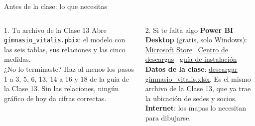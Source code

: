 \documentclass[aspectratio=169,11pt]{beamer}
\newcommand{\urlinstalar}{https://learn.microsoft.com/es-es/power-bi/fundamentals/desktop-get-the-desktop}
\newcommand{\urlstore}{https://apps.microsoft.com/detail/9ntxr16hnw1t?hl=es-co}
\newcommand{\urlcentro}{https://www.microsoft.com/download/details.aspx?id=58494}
\newcommand{\urldatos}{https://github.com/craljimenez/An-lisis_y_Visualizacion_de_Datos_para_la_Toma_de_Decisiones/raw/main/clases/semana07-clase14-dashboard-identificacion-insights/datos/gimnasio_vitalis.xlsx}
\begin{document}
\begin{frame}[t]{Antes de la clase: lo que necesitas}
  \begin{columns}[T,onlytextwidth]
    \begin{block}{1. Tu archivo de la Clase 13}
      \small Abre \texttt{gimnasio\_vitalis.pbix}: el modelo con las seis
      tablas, sus relaciones y las cinco medidas.\\[3pt]
      \footnotesize ¿No lo terminaste? Haz al menos los pasos 1 a 3, 5, 6,
      13, 14 a 16 y 18 de la guía de la Clase 13. Sin las relaciones,
      ningún gráfico de hoy da cifras correctas.
    \end{block}
    \begin{block}{2. Si te falta algo}
      \footnotesize
      \textbf{Power BI Desktop} (gratis, solo Windows):\\
      \href{\urlstore}{\color{esumerOrange}Microsoft Store} \textperiodcentered\
      \href{\urlcentro}{\color{esumerOrange}Centro de descargas} \textperiodcentered\
      \href{\urlinstalar}{\color{esumerOrange}guía de instalación}\\[4pt]
      \textbf{Datos de la clase}:
      \href{\urldatos}{\color{esumerOrange}descargar gimnasio\_vitalis.xlsx}.
      Es el mismo archivo de la Clase 13, que ya trae la ubicación de
      sedes y socios.\\[4pt]
      \textbf{Internet}: los mapas lo necesitan para dibujarse.
    \end{block}
  \end{columns}
\end{frame}
\end{document}
